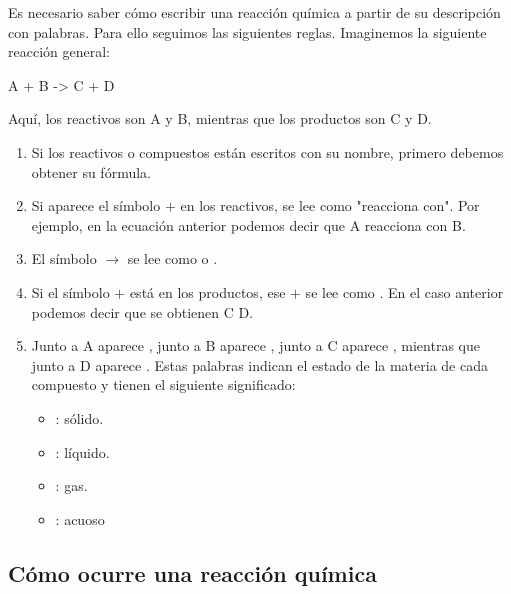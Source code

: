 Es necesario saber cómo escribir una reacción química a partir de su descripción con palabras.
Para ello seguimos las siguientes reglas.
Imaginemos la siguiente reacción general:
\begin{reaction*}
    A \gas{} + B \sld{} -> C \lqd{} + D \aq{}
\end{reaction*}
Aquí, los reactivos son A y B, mientras que los productos son C y D.
\begin{enumerate}[label=\numberballmDarkTeal]
        \item Si los reactivos o compuestos están escritos con su nombre, primero debemos obtener su fórmula.
        \item Si aparece el símbolo \( + \) en los reactivos, se lee como "reacciona con". Por ejemplo, en la ecuación anterior podemos decir que A reacciona con B.
        \item El símbolo \( \rightarrow \) se lee como  o .
        \item Si el símbolo \( + \) está en los productos, ese \( + \) se lee como .
        En el caso anterior podemos decir que se obtienen C  D.
        \item Junto a A aparece \gas{}, junto a B aparece \sld{}, junto a C aparece \lqd{}, mientras que junto a D aparece \aq{}. Estas palabras indican el estado de la materia de cada compuesto y tienen el siguiente significado:
        \begin{itemize}
            \item \sld{}: sólido.
            \item \lqd{}: líquido.
            \item \gas{}: gas.
            \item \aq{}: acuoso
        \end{itemize}
\end{enumerate}

\subsection{Cómo ocurre una reacción química}


